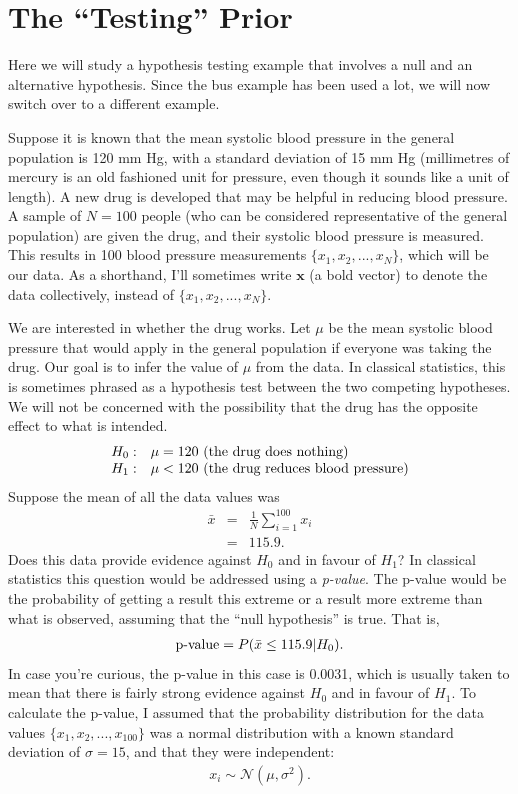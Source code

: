 \section{The ``Testing'' Prior}
Here we will study a hypothesis testing example that involves a null and an
alternative hypothesis. Since the bus example has been used a lot, we will now
switch over to a different example.

Suppose it is known that the mean systolic blood pressure
in the general population is 120 mm Hg, with a standard deviation of
15 mm Hg (millimetres of mercury is an
old fashioned unit for pressure, even though it sounds like a unit of length).
A new drug is developed that may
be helpful in reducing blood pressure. A sample of $N=100$ people
(who can be considered representative of the general population)
are given the drug, and their systolic blood pressure is measured. This results
in 100 blood pressure measurements $\{x_1, x_2, ..., x_N\}$, which will be
our data. As a shorthand, I'll sometimes write $\boldsymbol{x}$
(a bold vector) to denote the data collectively,
instead of $\{x_1, x_2, ..., x_N\}$.

We are interested in whether the drug works. Let $\mu$ be the mean systolic
blood pressure
that would apply in the general population if everyone was taking the
drug. Our goal is to infer the value of $\mu$ from the data. In classical
statistics, this is sometimes phrased as a hypothesis test between the two
competing hypotheses. We will not be concerned with the possibility that the
drug has the opposite effect to what is intended.
\begin{equation}
\begin{array}{ll}
H_0: & \mu = 120 \textnormal{ (the drug does nothing)}\\
H_1: & \mu < 120 \textnormal{ (the drug reduces blood pressure)}
\end{array}
\end{equation}
Suppose the mean of all the data values was
\begin{eqnarray}
\bar{x} &=& \frac{1}{N} \sum_{i=1}^{100} x_i\\
&=& 115.9.
\end{eqnarray} %
Does this data provide evidence against $H_0$ and in favour of $H_1$? In
classical statistics this question would be addressed using a {\it p-value}.
The p-value would be the probability of getting a result this extreme or
a result more extreme than what is observed, assuming that the ``null hypothesis''
is true. That is,
\begin{eqnarray}
\textnormal{p-value} = P(\bar{x} \leq 115.9 | H_0).
\end{eqnarray}
In case you're curious, the p-value in this case is 0.0031, which is usually
taken to mean that there is fairly strong evidence against $H_0$ and in favour
of $H_1$. To calculate the p-value, I assumed that the probability distribution
for the data values $\{x_1, x_2, ..., x_{100}\}$ was a normal distribution
with a known standard deviation of $\sigma=15$, and
that they were independent:
\begin{eqnarray}
x_i \sim \mathcal{N}(\mu, \sigma^2). \label{eq:normal}
\end{eqnarray}

